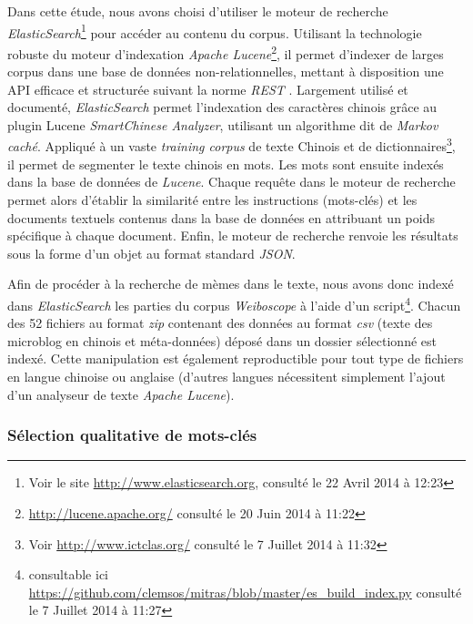     Dans cette étude, nous avons choisi d'utiliser le moteur de recherche \textit{ElasticSearch}\footnote{Voir le site \url{http://www.elasticsearch.org}, consulté le 22 Avril 2014 à 12:23} pour accéder au contenu du corpus. Utilisant la technologie robuste du moteur d'indexation \textit{Apache Lucene}\footnote{ \url{http://lucene.apache.org/} consulté le 20 Juin 2014 à 11:22}, il permet d'indexer de larges corpus dans une base de données non-relationnelles, mettant à disposition une API efficace et structurée suivant la norme \textit{REST} \citep{Masse2012}. Largement utilisé et documenté, \textit{ElasticSearch} permet l'indexation des caractères chinois grâce au plugin Lucene \textit{SmartChinese Analyzer}, utilisant un algorithme dit de \textit{Markov caché}. Appliqué à un vaste \textit{training corpus} de texte Chinois et de dictionnaires\footnote{Voir \url{http://www.ictclas.org/} consulté le 7 Juillet 2014 à 11:32}, il permet de segmenter le texte chinois en mots. Les mots sont ensuite indexés dans la base de données de \textit{Lucene}. Chaque requête dans le moteur de recherche permet alors d'établir la similarité entre les instructions (mots-clés) et les documents textuels contenus dans la base de données en attribuant un poids spécifique à chaque document. Enfin, le moteur de recherche renvoie les résultats sous la forme d'un objet au format standard \textit{JSON}.

    Afin de procéder à la recherche de mèmes dans le texte, nous avons donc indexé dans \textit{ElasticSearch} les parties du corpus \textit{Weiboscope} à l'aide d'un script\footnote{consultable ici \url{https://github.com/clemsos/mitras/blob/master/es_build_index.py} consulté le 7 Juillet 2014 à 11:27}. Chacun des 52 fichiers au format \textit{zip} contenant des données au format \textit{csv} (texte des microblog en chinois et méta-données) déposé dans un dossier sélectionné est indexé. Cette manipulation est également reproductible pour tout type de fichiers en langue chinoise ou anglaise (d'autres langues nécessitent simplement l'ajout d'un analyseur de texte \textit{Apache Lucene}).

\subsubsection[Sélection qualitative de mots-clés]{Sélection qualitative de mots-clés}

